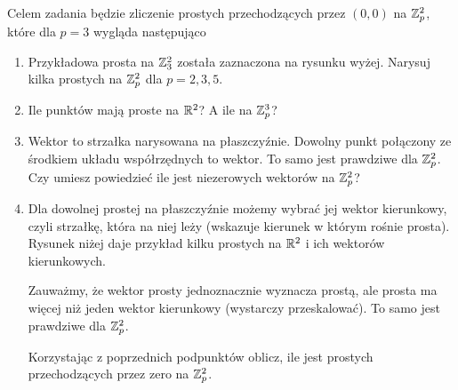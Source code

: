 \documentclass{article}
\begin{document}
\begin{zadanie}
  Celem zadania będzie zliczenie prostych przechodzących przez $(0,0)$ na $\mathbb{Z}_p^2$, które dla $p=3$ wygląda następująco
  \begin{center}
  \end{center}
  \begin{enumerate}
    \item Przykładowa prosta na $\mathbb{Z}_3^2$ została zaznaczona na rysunku wyżej. Narysuj kilka prostych na $\mathbb{Z}_p^2$ dla $p=2,3,5$.
    \item Ile punktów mają proste na $\mathbb{R}^2$? A ile na $\mathbb{Z}_p^3$?
    \item Wektor to strzałka narysowana na płaszczyźnie. Dowolny punkt połączony ze środkiem układu współrzędnych to wektor. To samo jest prawdziwe dla $\mathbb{Z}_p^2$. Czy umiesz powiedzieć ile jest niezerowych wektorów na $\mathbb{Z}_p^2$?
    \item Dla dowolnej prostej na płaszczyźnie możemy wybrać jej wektor kierunkowy, czyli strzałkę, która na niej leży (wskazuje kierunek w którym rośnie prosta). Rysunek niżej daje przykład kilku prostych na $\mathbb{R}^2$ i ich wektorów kierunkowych.
      \begin{center}
      \end{center}
      Zauważmy, że wektor prosty jednoznacznie wyznacza prostą, ale prosta ma więcej niż jeden wektor kierunkowy (wystarczy przeskalować). To samo jest prawdziwe dla $\mathbb{Z}_p^2$.

      Korzystając z poprzednich podpunktów oblicz, ile jest prostych przechodzących przez zero na $\mathbb{Z}_p^2$.
  \end{enumerate}
\end{zadanie}

\noindent\makebox[\linewidth]{\rule{\textwidth}{0.4pt}}
\end{document}
